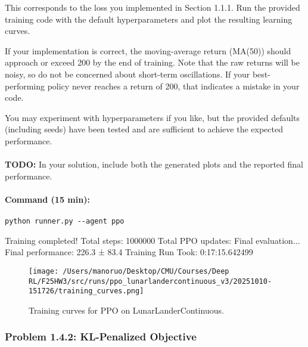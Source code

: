 \documentclass[12pt]{article}
\begin{document}
This corresponds to the loss you implemented in Section 1.1.1. Run the provided training code with the default hyperparameters and plot the resulting learning curves.  

If your implementation is correct, the moving-average return (MA(50)) should approach or exceed 200 by the end of training. Note that the raw returns will be noisy, so do not be concerned about short-term oscillations. If your best-performing policy never reaches a return of 200, that indicates a mistake in your code.  

You may experiment with hyperparameters if you like, but the provided defaults (including seeds) have been tested and are sufficient to achieve the expected performance.\\
\\
\noindent
\textbf{TODO:} In your solution, include both the generated plots and the reported final performance.

\paragraph{Command (15 min):}
\begin{verbatim}
python runner.py --agent ppo
\end{verbatim}


\begin{solution}[height=5cm]
Training completed! Total steps: 1000000
Total PPO updates: Final evaluation...
Final performance: 226.3 ± 83.4
Training Run Took: 0:17:15.642499
\begin{figure}[h]
    \centering
    \texttt{[image: /Users/manoruo/Desktop/CMU/Courses/Deep RL/F25HW3/src/runs/ppo\_lunarlandercontinuous\_v3/20251010-151726/training\_curves.png]}
    \caption{Training curves for PPO on LunarLanderContinuous.}
    \label{fig:ppo_curves}
\end{figure}

\end{solution}

\subsubsection*{Problem 1.4.2: KL-Penalized Objective}
\end{document}
